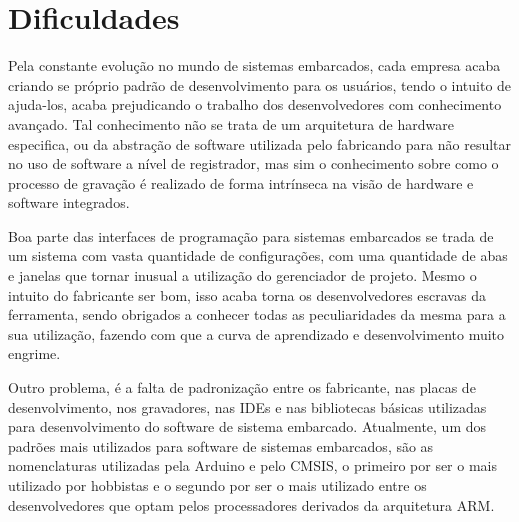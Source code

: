 \section{Dificuldades}
Pela constante evolução no mundo de sistemas embarcados, cada empresa acaba criando se próprio padrão de desenvolvimento para os
usuários, tendo o intuito de ajuda-los, acaba prejudicando o trabalho dos desenvolvedores com conhecimento avançado. Tal conhecimento
não se trata de um arquitetura de hardware especifica, ou da abstração de software utilizada pelo fabricando para não resultar no uso
de software a nível de registrador, mas sim o conhecimento sobre como o processo de gravação é realizado de forma intrínseca na visão
de hardware e software integrados.

Boa parte das interfaces de programação para sistemas embarcados se trada de um sistema com vasta quantidade de configurações,
com uma quantidade de abas e janelas que tornar inusual a utilização do gerenciador de projeto. Mesmo o intuito do fabricante ser bom,
isso acaba torna os desenvolvedores escravas da ferramenta, sendo obrigados a conhecer todas as peculiaridades da mesma para a sua
utilização, fazendo com que a curva de aprendizado e desenvolvimento muito engrime.

Outro problema, é a falta de padronização entre os fabricante, nas placas de desenvolvimento, nos gravadores, nas IDEs e nas bibliotecas
básicas utilizadas para desenvolvimento do software de sistema embarcado. Atualmente, um dos padrões mais utilizados para software
de sistemas embarcados, são as nomenclaturas utilizadas pela Arduino e pelo CMSIS, o primeiro por ser o mais utilizado por hobbistas
e o segundo por ser o mais utilizado entre os desenvolvedores que optam pelos processadores derivados da arquitetura ARM.

